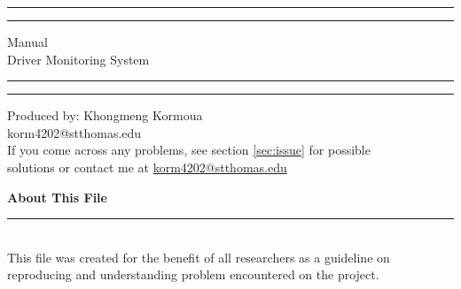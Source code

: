 \documentclass[12pt,hidelinks]{article}
\begin{document}
\begin{titlepage}
	\centering %
	\scshape %
	\vspace*{1.5\baselineskip} %

	\rule{13cm}{1.6pt}\vspace*{-\baselineskip}\vspace*{2pt} %
	\rule{13cm}{0.4pt} %
	
		\vspace{0.75\baselineskip} %
	{	\Huge Manual\\
			\vspace{4mm}
		Driver Monitoring System \\	}
		\vspace{0.75\baselineskip} %
	\rule{13cm}{0.4pt}\vspace*{-\baselineskip}\vspace{3.2pt} %
	\rule{13cm}{1.6pt} %
	
		\vspace{1.75\baselineskip} %
	{\large Produced by: Khongmeng Kormoua \\
		\vspace*{1.2\baselineskip}
	korm4202@stthomas.edu} \\
	\vfill
If you come across any problems, see section \ref{sec:issue} for possible\\ \vspace{1mm}
solutions or contact me at \url{korm4202@stthomas.edu}
\end{titlepage}
\tableofcontents
\vfill
\small{\noindent \textbf{About This File} \vspace{-3mm}\\
\noindent \rule{3.3cm}{0.5pt} \\
This file was created for the benefit of all researchers as a guideline on reproducing and understanding problem encountered on the project.}
\newpage
{}
\end{document}
